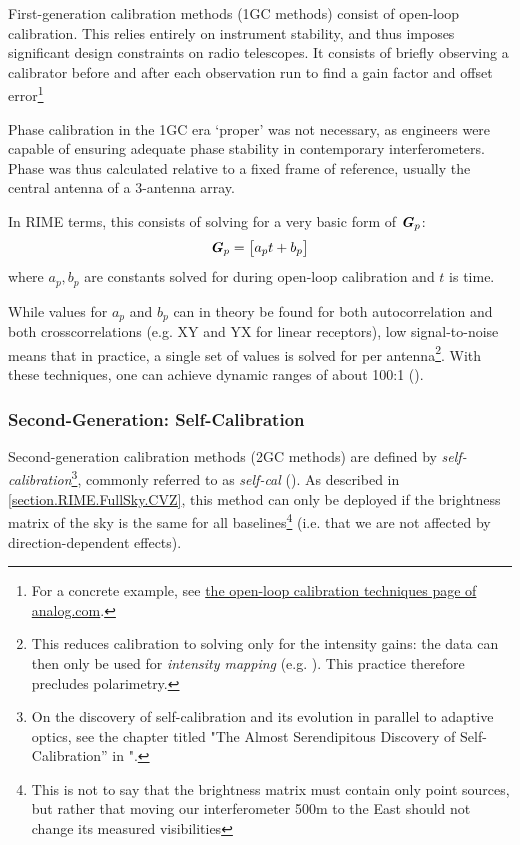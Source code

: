 \pg
First-generation calibration methods (1GC methods) consist of open-loop calibration. This relies entirely on instrument stability, and thus imposes significant design constraints on radio telescopes. It consists of briefly observing a calibrator before and after each observation run to find a gain factor and offset error\footnote{For a concrete example, see \href{http://www.analog.com/en/analog-dialogue/articles/open-loop-calibration-techniques.html}{the open-loop calibration techniques page of analog.com}.}

\pg
Phase calibration in the 1GC era `proper' was not necessary, as engineers were capable of ensuring adequate phase stability in contemporary interferometers. Phase was thus calculated relative to a fixed frame of reference, usually the central antenna of a 3-antenna array. 

\pg
In RIME terms, this consists of solving for a very basic form of $\textbf{\emph{G}}_p$:
\begin{equation}
\Gjones_p = \begin{bmatrix} a_p t + b_p \end{bmatrix} %
\end{equation}
where $a_p,b_p$ are constants solved for during open-loop calibration and $t$ is time. %

\pg
While values for $a_p$ and $b_p$ can in theory be found for both autocorrelation and both crosscorrelations (e.g. XY and YX for linear receptors), low signal-to-noise means that in practice, a single set of values is solved for per antenna\footnote{This reduces calibration to solving only for the intensity gains: the data can then only be used for \emph{intensity mapping} (e.g. ). This practice therefore precludes polarimetry.}. With these techniques, one can achieve dynamic ranges of about 100:1 ().

\subsubsection{Second-Generation: Self-Calibration}\label{section.calibration.2gc}

\pg
Second-generation calibration methods (2GC methods) are defined by \emph{self-calibration}\footnote{On the discovery of self-calibration and its evolution in parallel to adaptive optics, see the chapter titled "The Almost Serendipitous Discovery of Self-Calibration'' in "\href{http://library.nrao.edu/public/collection/02000000000280.pdf}{\citep{serendipitous}}.}, commonly referred to as \emph{self-cal} (). As described in \cref{section.RIME.FullSky.CVZ}, this method can only be deployed if the brightness matrix of the sky is the same for all baselines\footnote{This is not to say that the brightness matrix must contain only point sources, but rather that moving our interferometer 500m to the East should not change its measured visibilities} (i.e. that we are not affected by direction-dependent effects).


